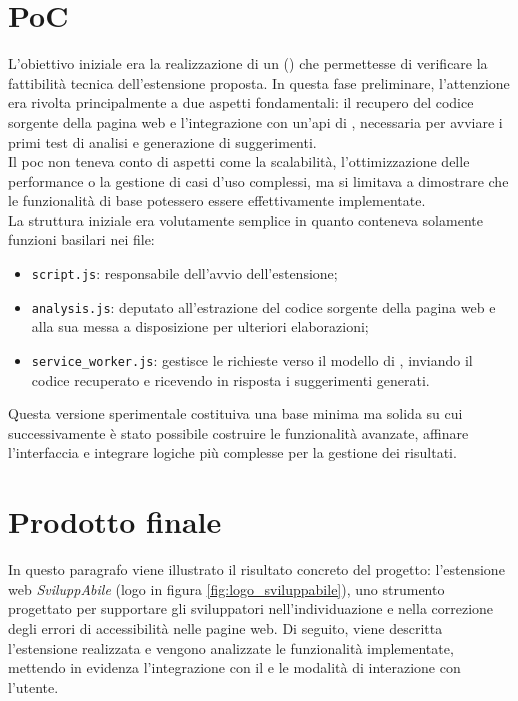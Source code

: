 \section{PoC}
\noindent L’obiettivo iniziale era la realizzazione di un  () che permettesse di verificare la fattibilità tecnica dell’estensione proposta. In questa fase preliminare, l’attenzione era rivolta principalmente a due aspetti fondamentali: il recupero del codice sorgente della pagina web e l’integrazione con un’\acrshort{api} di , necessaria per avviare i primi test di analisi e generazione di suggerimenti.\\
Il \acrshort{poc} non teneva conto di aspetti come la scalabilità, l’ottimizzazione delle performance o la gestione di casi d’uso complessi, ma si limitava a dimostrare che le funzionalità di base potessero essere effettivamente implementate. 
\\La struttura iniziale era volutamente semplice in quanto conteneva solamente funzioni basilari nei file:
\begin{itemize}
  \item \texttt{script.js}: responsabile dell’avvio dell’estensione;
  \item \texttt{analysis.js}: deputato all’estrazione del codice sorgente della pagina web e alla sua messa a disposizione per ulteriori elaborazioni;
  \item \texttt{service\_worker.js}: gestisce le richieste verso il modello di , inviando il codice recuperato e ricevendo in risposta i suggerimenti generati.
\end{itemize}

\noindent Questa versione sperimentale costituiva una base minima ma solida su cui successivamente è stato possibile costruire le funzionalità avanzate, affinare l’interfaccia e integrare logiche più complesse per la gestione dei risultati.\\


\section{Prodotto finale}
\noindent In questo paragrafo viene illustrato il risultato concreto del progetto: l’estensione web \textit{SviluppAbile} (logo in figura \ref{fig:logo_sviluppabile}), uno strumento progettato per supportare gli sviluppatori nell’individuazione e nella correzione degli errori di accessibilità nelle pagine web. Di seguito, viene descritta l’estensione realizzata e vengono analizzate le funzionalità implementate, mettendo in evidenza l’integrazione con il  e le modalità di interazione con l’utente.

